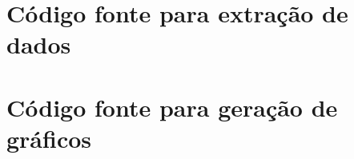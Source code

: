 \documentclass[
	12pt,           %
	openright,      %
	oneside,        %
	a4paper,        %
	brazil          %
]{abntex2}
\begin{document}

\begin{apendicesenv}

\partapendices
\chapter{Código fonte para extração de dados}

\lipsum[50]

\chapter{Código fonte para geração de gráficos}
\lipsum[55-57]

\end{apendicesenv}



\printindex
\end{document}
